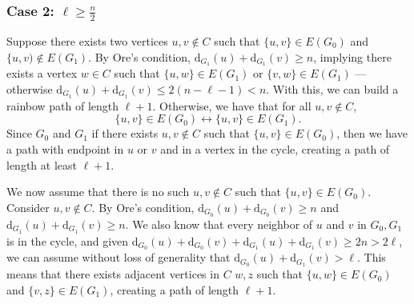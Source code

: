 \subsubsection{Case 2: \( \ell \geq \frac{n}{2} \)}

Suppose there exists two vertices \( u, v \not\in C \) such that \( \{u, v\} \in E(G_0) \) and \( \{u, v) \not\in E(G_1) \).
By Ore's condition, 
\( \text{d}_{G_1}(u) + \text{d}_{G_1}(v) \geq n \), 
implying there exists a vertex \( w \in C \) such that \( \{u, w\} \in E(G_1) \) or \( \{v, w\} \in E(G_1) \) 
--- otherwise \( \text{d}_{G_1}(u) + \text{d}_{G_1}(v) \leq 2 (n - \ell - 1) < n \).
With this, we can build a rainbow path of length \( \ell+1 \).
Otherwise, we have that for all \( u, v \not\in C \), 
\[ \{u, v\} \in E(G_0) \leftrightarrow \{u, v\} \in E(G_1). \]
Since \(G_0\) and \(G_1\) if there exists \(u, v \not\in C\) such that \( \{u, v\} \in E(G_0) \), 
then we have a path with endpoint in \(u\) or \(v\) and in a vertex in the cycle, creating a path of length at 
least \( \ell + 1 \).

We now assume that there is no such \(u, v \not \in C\) such that \( \{u, v\} \in E(G_0) \).
Consider \( u, v \not\in C \). By Ore's condition, 
\( \text{d}_{G_0}(u) + \text{d}_{G_0}(v) \geq n \) and \( \text{d}_{G_1}(u) + \text{d}_{G_1}(v) \geq n \). 
We also know that every neighbor of \(u\) and \(v\) in \(G_0, G_1\) is in the cycle, and
given \( \text{d}_{G_0}(u) + \text{d}_{G_0}(v) + \text{d}_{G_1}(u) + \text{d}_{G_1}(v) \geq 2n > 2\ell \), we 
can assume without loss of generality that \( \text{d}_{G_0}(u) + \text{d}_{G_1}(v) > \ell \).
This means that there exists adjacent vertices in \(C\) \(w, z\) such that
\( \{u, w\} \in E(G_0) \) and \( \{v, z\} \in E(G_1) \), creating a path of length \( \ell+1 \).
